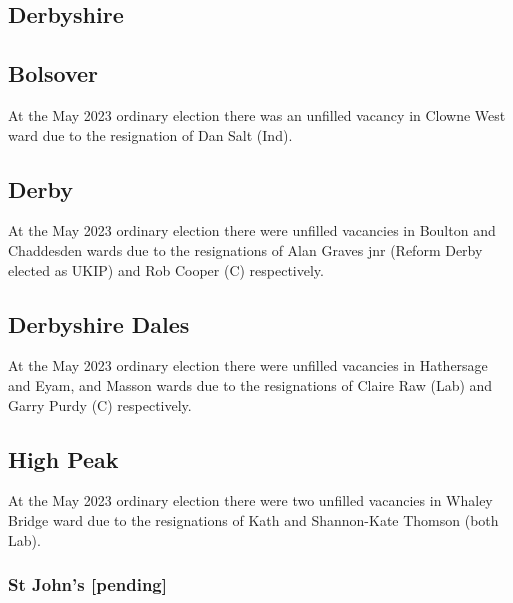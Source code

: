 \documentclass[a4paper,openany]{book}
\begin{document}
\begin{resultsiii}
\section{Derbyshire}

\subsection*{Bolsover}

At the May 2023 ordinary election there was an unfilled vacancy in Clowne West ward due to the resignation of Dan Salt (Ind).%

\subsection*{Derby}

At the May 2023 ordinary election there were unfilled vacancies in Boulton and Chaddesden wards due to the resignations of Alan Graves jnr (Reform Derby elected as UKIP) and Rob Cooper (C) respectively.%
%

\subsection*{Derbyshire Dales}

At the May 2023 ordinary election there were unfilled vacancies in Hathersage and Eyam, and Masson wards due to the resignations of Claire Raw (Lab) and Garry Purdy (C) respectively.%
%

\subsection*{High Peak}

At the May 2023 ordinary election there were two unfilled vacancies in Whaley Bridge ward due to the resignations of Kath and Shannon-Kate Thomson (both Lab).%

\subsubsection*{St John's \hspace*{\fill}\nolinebreak[1]%
	\enspace\hspace*{\fill}
	[pending]}


\end{resultsiii}
\end{document}
